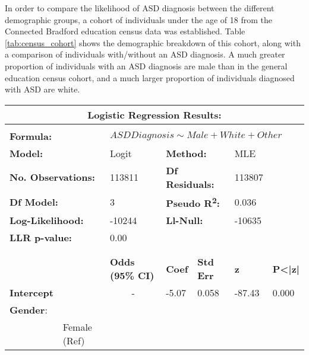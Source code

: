 \documentclass[
]{article}
\begin{document}
In order to compare the likelihood of ASD diagnosis between the
different demographic groups, a cohort of individuals under the age of
18 from the Connected Bradford education census data was established.
Table \ref{tab:census_cohort} shows the demographic breakdown of this
cohort, along with a comparison of individuals with/without an ASD
diagnosis. A much greater proportion of individuals with an ASD
diagnosis are male than in the general education census cohort, and a
much larger proportion of individuals diagnosed with ASD are white.

\begin{table}[H]
\centering
\begin{scriptsize}
\begin{tabular}{lllllll}
\toprule
\multicolumn{7}{c}{\textbf{Logistic Regression Results:}} \\[1mm]
\midrule\\
\multicolumn{2}{l}{\hspace{1cm}\textbf{Formula:}} & \multicolumn{5}{l}{\textit{$ASD Diagnosis \sim Male + White + Other$}} \\[1mm]
\multicolumn{2}{l}{\hspace{1cm}\textbf{Model:}} & Logit & \multicolumn{2}{l}{\textbf{Method:}} & MLE & \\[0.5mm]
\multicolumn{2}{l}{\hspace{1cm}\textbf{No. Observations:}} & 113811 & \multicolumn{2}{l}{\textbf{Df Residuals:}} & 113807 & \\[0.5mm]
\multicolumn{2}{l}{\hspace{1cm}\textbf{Df Model:}} & 3 & \multicolumn{2}{l}{\textbf{Pseudo R\textsuperscript{2}:}} & 0.036 & \\[0.5mm]
\multicolumn{2}{l}{\hspace{1cm}\textbf{Log-Likelihood:}} & -10244 & \multicolumn{2}{l}{\textbf{Ll-Null:}} & -10635 & \\[0.5mm]
\multicolumn{2}{l}{\hspace{1cm}\textbf{LLR p-value:}} & \multicolumn{5}{l}{0.00} \\\\
\midrule\\
& & \textbf{Odds (95\% CI)} & \textbf{Coef} & \textbf{Std Err} & \textbf{z} & \textbf{P\textless|z|} \\[1.5mm]
\textbf{Intercept} & & \multicolumn{1}{c}{-} & -5.07 & 0.058 & -87.43 & 0.000 \\[1.5mm]
\textbf{Gender}: & & & & & & \\
& Female (Ref) & & & & & \\

\end{tabular}
\end{scriptsize}
\end{table}
\end{document}
